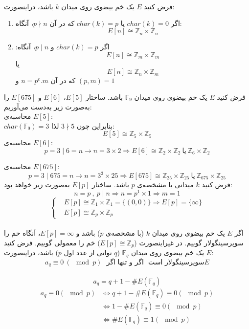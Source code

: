 \theorem 
فرض کنید 
$E$
یک خم بیضوی روی میدان 
$k$
باشد، دراینصورت:
\begin{enumerate}
\item{
اگر
$char(k)=0$
یا
$char(k)=p$
که در آن
$p \nmid n$،
آنگاه:
$$E[n] \cong \mathbb{Z}_n \times \mathbb{Z}_n$$
}

\item{
اگر
$char(k)=p$
و
$p \mid n$،
آنگاه:
$$E[n] \cong \mathbb{Z}_m \times \mathbb{Z}_m$$
یا
$$E[n] \cong \mathbb{Z}_n \times \mathbb{Z}_m$$
که در آن
$n=p^e.m$
و
$(p,m)=1$
}
\end{enumerate}
\example
فرض کنید
$E$
یک خم بیضوی روی میدان
$\mathbb{F}_9$
باشد. ساختار
$E[5]$،
$E[6]$
و
$E[675]$
را به‌صورت زیر به‌دست می‌آوریم:
\\
محاسبه‌ی
$E[5]$:
\\
$char(\mathbb{F}_9)=3$
 بنابراین چون
 $3 \nmid 5$
 لذا:
 $$ E[5] \cong \mathbb{Z}_5 \times \mathbb{Z}_5 $$
 محاسبه‌ی
 $E[6]$:
 \\
$$
p=3 \mid 6=n \longrightarrow n=3 \times 2 \Rightarrow
E[6] \cong \mathbb{Z}_2 \times \mathbb{Z}_2 ~\text{یا}~ \mathbb{Z}_6 \times \mathbb{Z}_2
$$ 

محاسبه‌ی
$E[675]$:
\\
$$
p=3 \mid 675=n \longrightarrow n=3^3 \times 25 \Rightarrow
E[675] \cong \mathbb{Z}_{25} \times \mathbb{Z}_{25} ~\text{یا}~ \mathbb{Z}_{675} \times \mathbb{Z}_{25}
$$ 
\example
فرض کنید
$k$
میدانی با مشخصه‌ی
$p$
باشد. ساختار
$E[p]$
به‌صورت زیر خواهد بود:
\\
$$ n=p ~,~ p \mid n \Longrightarrow n=p^1 \times 1 \Longrightarrow m=1 $$
\begin{equation*}
\begin{cases}
& E[p] \cong  \mathbb{Z}_1 \times \mathbb{Z}_1 = \{(0,0)\} \Longrightarrow E[p]=\{ \infty \}\\
& E[p] \cong  \mathbb{Z}_p \times \mathbb{Z}_p
\end{cases}
\end{equation*}
\\
اگر
$E$
یک خم بیضوی روی میدان
$k$
(با مشخصه‌ی
$p$)
باشد و 
$E[p]={\infty}$،
آنگاه خم را سوپرسینگولار گوییم. در غیراینصورت ($E[p] \cong \mathbb{Z}_p$)
خم را معمولی گوییم.
\theorem 
فرض کنید 
$E$
یک خم بیضوی روی میدان
$ \mathbb{F}_q$
($q$
توانی از عدد اول
$p$)
باشد، دراینصورت:
$$ a_q \equiv 0 ~ (\mod p) ~~~\text{اگر و تنها اگر}~~~ \text{سوپرسینگولار است} E	 $$
\\
\remark
$$a_q = q+1- \# E(\mathbb{F}_q)$$
\begin{align*}
a_q \equiv 0 (\mod p) 
&	\iff q+1- \#E(\mathbb{F}_q) \equiv 0 (\mod p) \\
&	\iff 1- \#E(\mathbb{F}_q) \equiv 0 (\mod p)	\\
&	\iff \#E(\mathbb{F}_q) \equiv 1 (\mod p)
\end{align*}
\\
